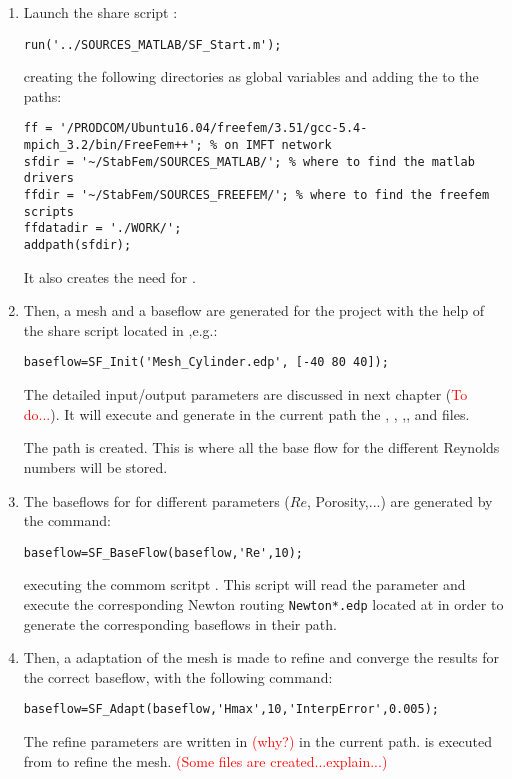 \begin{enumerate}
\item Launch the share script :
\begin{lstlisting}
run('../SOURCES_MATLAB/SF_Start.m');
\end{lstlisting}
creating the following directories as global variables and adding the  to the  paths:
\begin{lstlisting}
ff = '/PRODCOM/Ubuntu16.04/freefem/3.51/gcc-5.4-mpich_3.2/bin/FreeFem++'; % on IMFT network
sfdir = '~/StabFem/SOURCES_MATLAB/'; % where to find the matlab drivers
ffdir = '~/StabFem/SOURCES_FREEFEM/'; % where to find the freefem scripts
ffdatadir = './WORK/';
addpath(sfdir);
\end{lstlisting}
It also creates the  need for .


\item Then, a mesh and a baseflow are generated for the project with the help of the share script  located in ,e.g.:

\begin{lstlisting}
baseflow=SF_Init('Mesh_Cylinder.edp', [-40 80 40]);
\end{lstlisting}

The detailed input/output parameters are discussed in next chapter (\textcolor{red}{To do...}). It will execute  and generate in the current path the , , ,,  and  files. 

The path  is created. This is where all the base flow for the different Reynolds numbers will be stored.



\item The baseflows for for different parameters ($Re$, Porosity,...) are generated by the command: 
\begin{lstlisting}
baseflow=SF_BaseFlow(baseflow,'Re',10);
\end{lstlisting}
executing the commom scritpt . This script will read the  parameter and execute the corresponding Newton routing \texttt{Newton*.edp} located at  in order to generate the corresponding baseflows in their path.


\item Then, a adaptation of the mesh is made to refine and converge the results for the correct baseflow, with the following command:
\begin{lstlisting}
baseflow=SF_Adapt(baseflow,'Hmax',10,'InterpError',0.005);
\end{lstlisting}
The refine parameters are written in \textcolor{red}{(why?)} in the current path.  is executed from  to refine the mesh. \textcolor{red}{(Some files are created...explain...)}


\end{enumerate}
